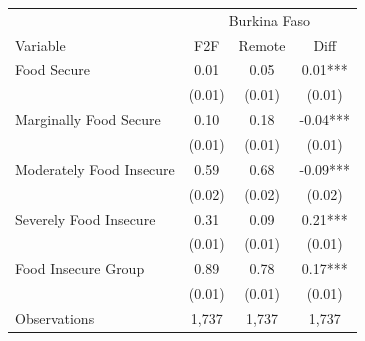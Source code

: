 \begin{tabular}{l*{3}c}
\hline\hline
 & \multicolumn{3}{c}{Burkina Faso}\\ 
Variable & F2F & Remote & Diff \\
\hline
Food Secure&0.01&0.05&0.01***\\
&(0.01)&(0.01)&(0.01)\\
Marginally Food Secure&0.10&0.18&-0.04***\\
&(0.01)&(0.01)&(0.01)\\
Moderately Food Insecure&0.59&0.68&-0.09***\\
&(0.02)&(0.02)&(0.02)\\
Severely Food Insecure&0.31&0.09&0.21***\\
&(0.01)&(0.01)&(0.01)\\
Food Insecure Group&0.89&0.78&0.17***\\
&(0.01)&(0.01)&(0.01)\\
\hline
Observations & 1,737 & 1,737 & 1,737 \\
\hline\hline
\end{tabular}
